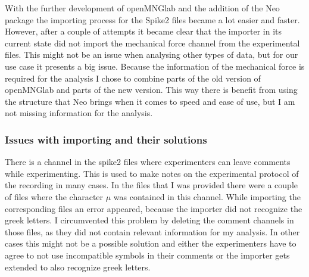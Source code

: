 With the further development of openMNGlab and the addition of the Neo package the importing process for the Spike2 files became a lot easier and faster. However, after a couple of attempts it became clear that the importer in its current state did not import the mechanical force channel from the experimental files. This might not be an issue when analysing other types of data, but for our use case it presents a big issue. Because the information of the mechanical force is required for the analysis I chose to combine parts of the old version of openMNGlab and parts of the new version. This way there is benefit from using the structure that Neo brings when it comes to speed and ease of use, but I am not missing information for the analysis.

\subsubsection{Issues with importing and their solutions}
There is a channel in the spike2 files where experimenters can leave comments while experimenting. This is used to make notes on the experimental protocol of the recording in many cases. In the files that I was provided there were a couple of files where the character $\mu$ was contained in this channel. While importing the corresponding files an error appeared, because the importer did not recognize the greek letters. I circumvented this problem by deleting the comment channels in those files, as they did not contain relevant information for my analysis. In other cases this might not be a possible solution and either the experimenters have to agree to not use incompatible symbols in their comments or the importer gets extended to also recognize greek letters.

